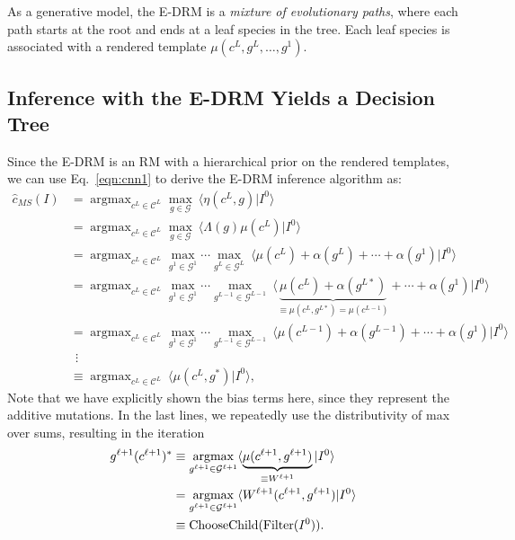 \documentclass[12pt]{article}
\DeclareMathOperator*{\argmax}{argmax}
\newcommand{\Cl}[0]{{ \mathcal{C} }}
\newcommand{\G}[0]{{ \mathcal{G} }}
\begin{document}
As a generative model, the E-DRM is a {\em mixture of evolutionary paths}, where each path starts at the root and ends at a leaf species in the tree. Each leaf species is associated with a rendered template $\mu(c^{L},g^{L},\ldots, g^{1})$.

\subsection{Inference with the E-DRM Yields a Decision Tree}

Since the E-DRM is an RM with a hierarchical prior on the rendered templates, we can use Eq.~\ref{eqn:cnn1} to derive the E-DRM inference algorithm as:
\begin{align} 
	\hat{c}_{MS}(I) &= \argmax_{c^{L} \in \Cl^{L}} \max_{g\in \G} \: \langle \eta(c^{L},g) | I^{0} \rangle \nonumber\\
	                        &= \argmax_{c^{L} \in \Cl^{L}} \max_{g\in \G} \: \langle \Lambda(g) \mu(c^{L}) | I^{0}  \rangle \nonumber\\
	                        &= \argmax_{c^{L} \in \Cl^{L}} \max_{g^{1}\in \G^{1}} \cdots \max_{g^{L}\in \G^{L}} \: \langle \mu(c^{L}) + \alpha(g^{L}) + \cdots + \alpha(g^{1}) | I^{0}  \rangle \nonumber\\
	                        &= \argmax_{c^{L} \in \Cl^{L}} \max_{g^{1}\in \G^{1}} \cdots \max_{g^{L-1}\in \G^{L-1}} \: 
	                        		\langle \underbrace{\mu(c^{L}) + \alpha(g^{L*})}_{\equiv \mu(c^{L},g^{L*}) = \mu(c^{L-1})} + \cdots + \alpha(g^{1}) | I^{0}  
					\rangle \nonumber\\
	                        &= \argmax_{c^{L} \in \Cl^{L}} \max_{g^{1}\in \G^{1}} \cdots \max_{g^{L-1}\in \G^{L-1}} \: 
	                        		\langle \mu(c^{L-1}) + \alpha(g^{L-1}) + \cdots + \alpha(g^{1}) | I^{0}  
					\rangle \nonumber\\
	                        &~~\vdots \nonumber\\
	                        &\equiv \argmax_{c^{L} \in \Cl^{L}} \: \langle \mu(c^{L}, g^{*}) | I^{0}  \rangle,                 \label{eqn:inf-DRM-RDF}
\end{align}
Note that we have explicitly shown the bias terms here, since they represent the additive mutations. In the last lines, we repeatedly use the distributivity of max over sums, resulting in the iteration
\begin{align}
	g^{\ell+1}(c^{\ell+1})^{*} &\equiv \argmax_{g^{\ell+1}\in \G^{\ell+1}} \langle \underbrace{\mu(c^{\ell+1},g^{\ell+1})}_{\equiv W^{\ell+1}} | I^{0} \rangle \nonumber\\
		       &= \argmax_{g^{\ell+1}\in \G^{\ell+1}} \langle W^{\ell+1}(c^{\ell+1},g^{\ell+1}) | I^{0} \rangle \nonumber\\
	               &\equiv {\rm ChooseChild}({\rm Filter}(I^{0})).
	\label{eqn:iterCG-RDF}
\end{align}
\end{document}
